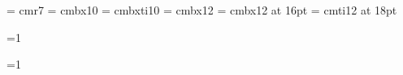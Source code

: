 




\font\small = cmr7
\font\sxmplbx = cmbx10 
\font\sxmplbxti = cmbxti10 
\font\xmplbx = cmbx12 %
\font\mxmplbx = cmbx12 at 16pt
\font\bxmplbx = cmti12 at 18pt %

\def\title#1{%
{\bxmplbx {\centerline {#1}}}
\vskip .2in
  {\leftskip = 2.5in%
  \par\noindent\llap{\hbox to 2.5in{\hfil {\bf Author:} }}{\it R. Scott
  McIntire}\par\noindent {\it Computational Medicine
  Laboratory}\par\noindent {\it Pfizer, Inc.}\par%
  }%
\vskip .1in
 {\leftskip = 2.5in%
  \par\noindent\llap{\hbox to 2.5in{\hfil {\bf Date:} }} \date \par%
  }%
\vskip .25in
\hrule height 1pt
\vskip .1in
}

\def\section#1{\vskip .5in \centerline{\mxmplbx #1} \bigskip}

\def\subsection#1{\vskip .25 in \leftline{\xmplbx #1} \medskip}

=1
\def\ftn#1{%
	\footnote {\kern 0.5pt {\raise 3.5pt \hbox{\small \number\count4}}}{#1}
	\global\advance\count4 by 1
}

=1
\def\chapter#1{%
\vfil
\supereject
{\bxmplbx {\centerline {Chapter \number\count3: #1}}}
\vskip .2in
\hrule height 1pt
\vskip .2in
\ifnum \count3 = 1 \pageno=1 \fi
\global\advance\count3 by 1
}%

\def\appendix#1{%
\vfil
\supereject
\section{#1}
}%

